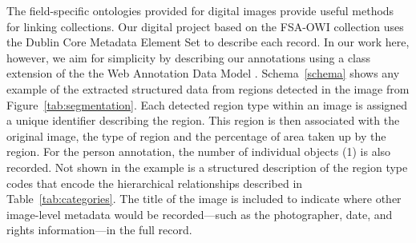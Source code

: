 \documentclass[10pt, a4paper]{article}
\begin{document}
The field-specific ontologies provided for digital images provide useful
methods for linking collections. Our digital project based on the FSA-OWI
collection uses the Dublin Core Metadata Element Set to describe each record.
In our work here, however, we aim for simplicity by describing our annotations
using a class extension of the the Web Annotation Data Model \cite{w3c}.
Schema~\ref{schema} shows any example of the extracted structured data from
regions detected in the image from Figure~\ref{tab:segmentation}. Each detected
region type within an image is assigned a unique identifier describing the
region. This region is then associated with the original image, the type of
region and the percentage of area taken up by the region. For the person
annotation, the number of individual objects (1) is also recorded. Not shown
in the example is a structured description of the region type codes that
encode the hierarchical relationships described in Table~\ref{tab:categories}.
The title of the image is included to indicate where other image-level metadata
would be recorded---such as the photographer, date, and rights information---in
the full record.
\end{document}
